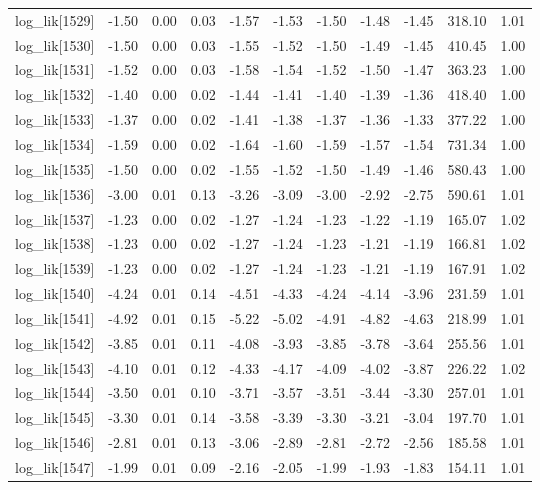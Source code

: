 \begin{table}[ht]
\begin{tabular}{rrrrrrrrrrr}
  log\_lik[1529] & -1.50 & 0.00 & 0.03 & -1.57 & -1.53 & -1.50 & -1.48 & -1.45 & 318.10 & 1.01 \\ 
  log\_lik[1530] & -1.50 & 0.00 & 0.03 & -1.55 & -1.52 & -1.50 & -1.49 & -1.45 & 410.45 & 1.00 \\ 
  log\_lik[1531] & -1.52 & 0.00 & 0.03 & -1.58 & -1.54 & -1.52 & -1.50 & -1.47 & 363.23 & 1.00 \\ 
  log\_lik[1532] & -1.40 & 0.00 & 0.02 & -1.44 & -1.41 & -1.40 & -1.39 & -1.36 & 418.40 & 1.00 \\ 
  log\_lik[1533] & -1.37 & 0.00 & 0.02 & -1.41 & -1.38 & -1.37 & -1.36 & -1.33 & 377.22 & 1.00 \\ 
  log\_lik[1534] & -1.59 & 0.00 & 0.02 & -1.64 & -1.60 & -1.59 & -1.57 & -1.54 & 731.34 & 1.00 \\ 
  log\_lik[1535] & -1.50 & 0.00 & 0.02 & -1.55 & -1.52 & -1.50 & -1.49 & -1.46 & 580.43 & 1.00 \\ 
  log\_lik[1536] & -3.00 & 0.01 & 0.13 & -3.26 & -3.09 & -3.00 & -2.92 & -2.75 & 590.61 & 1.01 \\ 
  log\_lik[1537] & -1.23 & 0.00 & 0.02 & -1.27 & -1.24 & -1.23 & -1.22 & -1.19 & 165.07 & 1.02 \\ 
  log\_lik[1538] & -1.23 & 0.00 & 0.02 & -1.27 & -1.24 & -1.23 & -1.21 & -1.19 & 166.81 & 1.02 \\ 
  log\_lik[1539] & -1.23 & 0.00 & 0.02 & -1.27 & -1.24 & -1.23 & -1.21 & -1.19 & 167.91 & 1.02 \\ 
  log\_lik[1540] & -4.24 & 0.01 & 0.14 & -4.51 & -4.33 & -4.24 & -4.14 & -3.96 & 231.59 & 1.01 \\ 
  log\_lik[1541] & -4.92 & 0.01 & 0.15 & -5.22 & -5.02 & -4.91 & -4.82 & -4.63 & 218.99 & 1.01 \\ 
  log\_lik[1542] & -3.85 & 0.01 & 0.11 & -4.08 & -3.93 & -3.85 & -3.78 & -3.64 & 255.56 & 1.01 \\ 
  log\_lik[1543] & -4.10 & 0.01 & 0.12 & -4.33 & -4.17 & -4.09 & -4.02 & -3.87 & 226.22 & 1.02 \\ 
  log\_lik[1544] & -3.50 & 0.01 & 0.10 & -3.71 & -3.57 & -3.51 & -3.44 & -3.30 & 257.01 & 1.01 \\ 
  log\_lik[1545] & -3.30 & 0.01 & 0.14 & -3.58 & -3.39 & -3.30 & -3.21 & -3.04 & 197.70 & 1.01 \\ 
  log\_lik[1546] & -2.81 & 0.01 & 0.13 & -3.06 & -2.89 & -2.81 & -2.72 & -2.56 & 185.58 & 1.01 \\ 
  log\_lik[1547] & -1.99 & 0.01 & 0.09 & -2.16 & -2.05 & -1.99 & -1.93 & -1.83 & 154.11 & 1.01 \\ 

\end{tabular}
\end{table}
